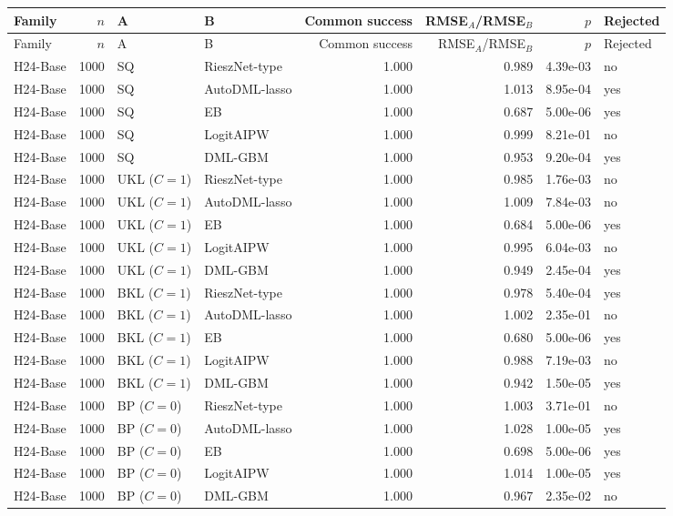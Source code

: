 \begin{tabular}{lrllrrrl}
\hline
Family & $n$ & A & B & Common success & RMSE$_A$/RMSE$_B$ & $p$ & Rejected \\
\hline
\endfirsthead
\hline
Family & $n$ & A & B & Common success & RMSE$_A$/RMSE$_B$ & $p$ & Rejected \\
\hline
\endhead
H24-Base & 1000 & SQ & RieszNet-type & 1.000 & 0.989 & 4.39e-03 & no \\
H24-Base & 1000 & SQ & AutoDML-lasso & 1.000 & 1.013 & 8.95e-04 & yes \\
H24-Base & 1000 & SQ & EB & 1.000 & 0.687 & 5.00e-06 & yes \\
H24-Base & 1000 & SQ & LogitAIPW & 1.000 & 0.999 & 8.21e-01 & no \\
H24-Base & 1000 & SQ & DML-GBM & 1.000 & 0.953 & 9.20e-04 & yes \\
H24-Base & 1000 & UKL ($C=1$) & RieszNet-type & 1.000 & 0.985 & 1.76e-03 & no \\
H24-Base & 1000 & UKL ($C=1$) & AutoDML-lasso & 1.000 & 1.009 & 7.84e-03 & no \\
H24-Base & 1000 & UKL ($C=1$) & EB & 1.000 & 0.684 & 5.00e-06 & yes \\
H24-Base & 1000 & UKL ($C=1$) & LogitAIPW & 1.000 & 0.995 & 6.04e-03 & no \\
H24-Base & 1000 & UKL ($C=1$) & DML-GBM & 1.000 & 0.949 & 2.45e-04 & yes \\
H24-Base & 1000 & BKL ($C=1$) & RieszNet-type & 1.000 & 0.978 & 5.40e-04 & yes \\
H24-Base & 1000 & BKL ($C=1$) & AutoDML-lasso & 1.000 & 1.002 & 2.35e-01 & no \\
H24-Base & 1000 & BKL ($C=1$) & EB & 1.000 & 0.680 & 5.00e-06 & yes \\
H24-Base & 1000 & BKL ($C=1$) & LogitAIPW & 1.000 & 0.988 & 7.19e-03 & no \\
H24-Base & 1000 & BKL ($C=1$) & DML-GBM & 1.000 & 0.942 & 1.50e-05 & yes \\
H24-Base & 1000 & BP ($C=0$) & RieszNet-type & 1.000 & 1.003 & 3.71e-01 & no \\
H24-Base & 1000 & BP ($C=0$) & AutoDML-lasso & 1.000 & 1.028 & 1.00e-05 & yes \\
H24-Base & 1000 & BP ($C=0$) & EB & 1.000 & 0.698 & 5.00e-06 & yes \\
H24-Base & 1000 & BP ($C=0$) & LogitAIPW & 1.000 & 1.014 & 1.00e-05 & yes \\
H24-Base & 1000 & BP ($C=0$) & DML-GBM & 1.000 & 0.967 & 2.35e-02 & no \\

\end{tabular}
